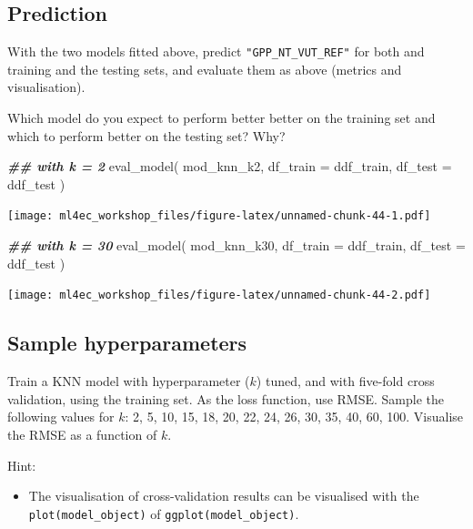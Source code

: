 \documentclass[
]{book}
\newenvironment{Shaded}{\begin{snugshade}}{\end{snugshade}}
\newcommand{\AttributeTok}[1]{\textcolor[rgb]{0.77,0.63,0.00}{#1}}
\newcommand{\DocumentationTok}[1]{\textcolor[rgb]{0.56,0.35,0.01}{\textbf{\textit{#1}}}}
\newcommand{\FunctionTok}[1]{\textcolor[rgb]{0.00,0.00,0.00}{#1}}
\newcommand{\NormalTok}[1]{#1}
\providecommand{\tightlist}{%
  \setlength{\itemsep}{0pt}\setlength{\parskip}{0pt}}
\begin{document}
\hypertarget{prediction-4}{%
\subsection{Prediction}\label{prediction-4}}

With the two models fitted above, predict \texttt{"GPP\_NT\_VUT\_REF"} for both and training and the testing sets, and evaluate them as above (metrics and visualisation).

Which model do you expect to perform better better on the training set and which to perform better on the testing set? Why?

\begin{Shaded}
\begin{Highlighting}[]
\DocumentationTok{\#\# with k = 2}
\FunctionTok{eval\_model}\NormalTok{(}
\NormalTok{  mod\_knn\_k2, }
  \AttributeTok{df\_train =}\NormalTok{ ddf\_train, }
  \AttributeTok{df\_test =}\NormalTok{ ddf\_test}
\NormalTok{  )}
\end{Highlighting}
\end{Shaded}

\texttt{[image: ml4ec\_workshop\_files/figure-latex/unnamed-chunk-44-1.pdf]}

\begin{Shaded}
\begin{Highlighting}[]
\DocumentationTok{\#\# with k = 30}
\FunctionTok{eval\_model}\NormalTok{(}
\NormalTok{  mod\_knn\_k30, }
  \AttributeTok{df\_train =}\NormalTok{ ddf\_train, }
  \AttributeTok{df\_test =}\NormalTok{ ddf\_test}
\NormalTok{  )}
\end{Highlighting}
\end{Shaded}

\texttt{[image: ml4ec\_workshop\_files/figure-latex/unnamed-chunk-44-2.pdf]}

\hypertarget{sample-hyperparameters-1}{%
\subsection{Sample hyperparameters}\label{sample-hyperparameters-1}}

Train a KNN model with hyperparameter (\(k\)) tuned, and with five-fold cross validation, using the training set. As the loss function, use RMSE. Sample the following values for \(k\): 2, 5, 10, 15, 18, 20, 22, 24, 26, 30, 35, 40, 60, 100. Visualise the RMSE as a function of \(k\).

Hint:

\begin{itemize}
\tightlist
\item
  The visualisation of cross-validation results can be visualised with the \texttt{plot(model\_object)} of \texttt{ggplot(model\_object)}.
\end{itemize}
\end{document}
